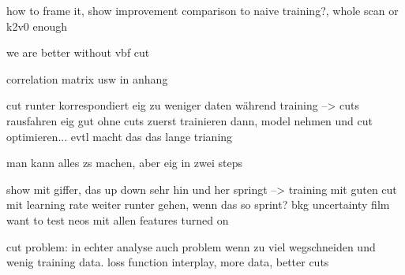 how to frame it, show improvement comparison to naive training?, whole scan or k2v0 enough

we are better without vbf cut

correlation matrix usw in anhang








cut runter korrespondiert eig zu weniger daten während training --> cuts rausfahren
eig gut ohne cuts zuerst trainieren dann, model nehmen und cut optimieren...  evtl macht das das lange trianing

man kann alles zs machen, aber eig in zwei steps

show mit giffer, das up down sehr hin und her springt --> training mit guten cut
mit learning rate weiter runter gehen, wenn das so sprint?
bkg uncertainty film
want to test neos mit allen features turned on

cut problem: in echter analyse auch problem wenn zu viel wegschneiden und wenig training data. loss function interplay, more data, better cuts






